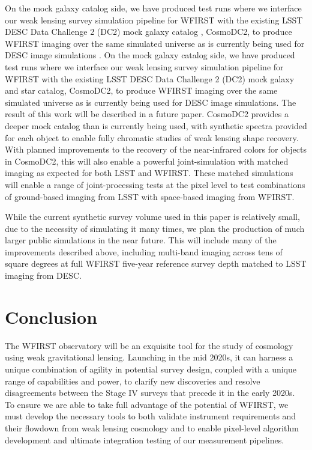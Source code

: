 \documentclass[usenatbib]{mnras}
\begin{document}
On the mock galaxy catalog side, we have produced test runs where we interface our weak lensing survey simulation pipeline for WFIRST with the existing LSST DESC Data Challenge 2 (DC2) mock galaxy catalog \citep{2019arXiv190706530K}, CosmoDC2, to produce WFIRST imaging over the same simulated universe as is currently being used for DESC image simulations \citep{dc2all}.  %
On the mock galaxy catalog side, we have produced test runs where we interface our weak lensing survey simulation pipeline for WFIRST with the existing LSST DESC Data Challenge 2 (DC2) mock galaxy and star catalog, CosmoDC2, to produce WFIRST imaging over the same simulated universe as is currently being used for DESC image simulations. 
The result of this work will be described in a future paper. CosmoDC2 provides a deeper mock catalog than is currently being used, with synthetic spectra provided for each object to enable fully chromatic studies of weak lensing shape recovery. 
With planned improvements to the recovery of the near-infrared colors for objects in CosmoDC2, this will also enable a powerful joint-simulation with matched imaging as expected for both LSST and WFIRST. 
These matched simulations will enable a range of joint-processing tests at the pixel level to test combinations of ground-based imaging from LSST with space-based imaging from WFIRST.

While the current synthetic survey volume used in this paper is relatively small, due to the necessity of simulating it many times, we plan the production of much larger public simulations in the near future. 
This will include many of the improvements described above, including multi-band imaging across tens of square degrees at full WFIRST five-year reference survey depth matched to LSST imaging from DESC. 

\section{Conclusion}\label{sec:conclusion}

The WFIRST observatory will be an exquisite tool for the study of cosmology using weak gravitational lensing. 
Launching in the mid 2020s, it can harness a unique combination of agility in potential survey design, coupled with a unique range of capabilities and power, to clarify new discoveries and resolve disagreements between the Stage IV surveys that precede it in the early 2020s. 
To ensure we are able to take full advantage of the potential of WFIRST, we must develop the necessary tools to both validate instrument requirements and their flowdown from weak lensing cosmology and to enable pixel-level algorithm development and ultimate integration testing of our measurement pipelines.
\end{document}
